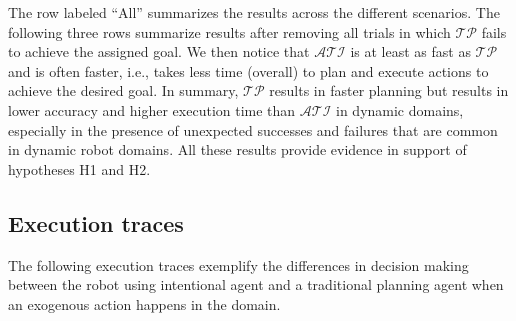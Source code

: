 \documentclass[letterpaper, 10 pt, conference]{ieeeconf}  %
\begin{document}
The row labeled ``All'' summarizes the results across the different
scenarios.  The following three rows summarize results after removing
all trials in which $\mathcal{TP}$ fails to achieve the assigned goal.
We then notice that $\mathcal{ATI}$ is at least as fast as
$\mathcal{TP}$ and is often faster, i.e., takes less time (overall) to
plan and execute actions to achieve the desired goal. In summary,
$\mathcal{TP}$ results in faster planning but results in lower
accuracy and higher execution time than $\mathcal{ATI}$ in dynamic
domains, especially in the presence of unexpected successes and
failures that are common in dynamic robot domains. All these results
provide evidence in support of hypotheses H1 and H2.





\subsection{Execution traces}
\label{sec:expres-traces}
The following execution traces exemplify the differences in decision
making between the robot using  intentional agent and a traditional planning
agent when an exogenous action happens in the domain.
\end{document}
